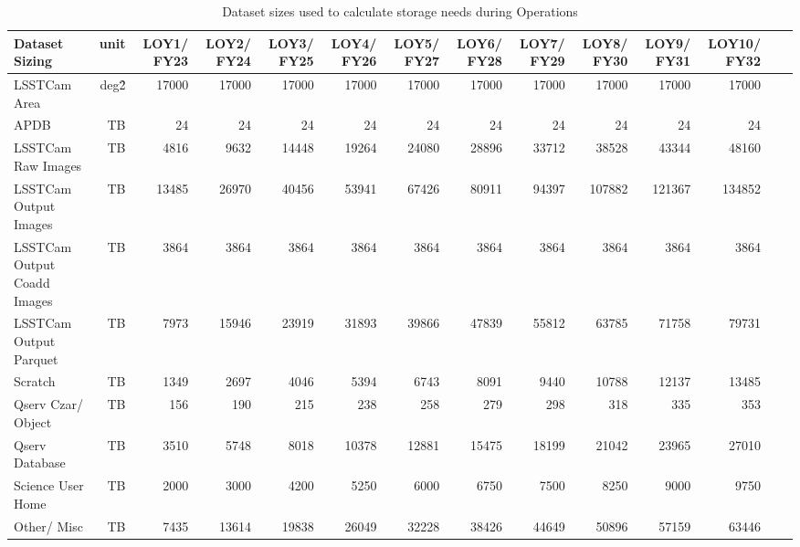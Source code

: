 \tiny \begin{longtable} { |p{}  |r  |r  |r  |r  |r  |r  |r  |r  |r  |r  |r  |r  |r |} 
\caption{Dataset sizes used to calculate storage needs during Operations \label{tab:datasetSizingOps}}\\ 
\hline 
\textbf{Dataset Sizing}&\textbf{unit}&\textbf{LOY1/ FY23}&\textbf{LOY2/ FY24}&\textbf{LOY3/ FY25}&\textbf{LOY4/ FY26}&\textbf{LOY5/ FY27}&\textbf{LOY6/ FY28}&\textbf{LOY7/ FY29}&\textbf{LOY8/ FY30}&\textbf{LOY9/ FY31}&\textbf{LOY10/ FY32}& \\ \hline
{LSSTCam Area}&{deg\^2}&{17000}&{17000}&{17000}&{17000}&{17000}&{17000}&{17000}&{17000}&{17000}&{17000}& \\ \hline
{APDB}&{TB}&{24}&{24}&{24}&{24}&{24}&{24}&{24}&{24}&{24}&{24}& \\ \hline
{LSSTCam Raw Images}&{TB}&{4816}&{9632}&{14448}&{19264}&{24080}&{28896}&{33712}&{38528}&{43344}&{48160}& \\ \hline
{LSSTCam Output Images}&{TB}&{13485}&{26970}&{40456}&{53941}&{67426}&{80911}&{94397}&{107882}&{121367}&{134852}& \\ \hline
{LSSTCam Output Coadd Images}&{TB}&{3864}&{3864}&{3864}&{3864}&{3864}&{3864}&{3864}&{3864}&{3864}&{3864}& \\ \hline
{LSSTCam Output Parquet}&{TB}&{7973}&{15946}&{23919}&{31893}&{39866}&{47839}&{55812}&{63785}&{71758}&{79731}& \\ \hline
{Scratch}&{TB}&{1349}&{2697}&{4046}&{5394}&{6743}&{8091}&{9440}&{10788}&{12137}&{13485}& \\ \hline
{Qserv Czar/ Object}&{TB}&{156}&{190}&{215}&{238}&{258}&{279}&{298}&{318}&{335}&{353}& \\ \hline
{Qserv Database}&{TB}&{3510}&{5748}&{8018}&{10378}&{12881}&{15475}&{18199}&{21042}&{23965}&{27010}& \\ \hline
{Science User Home}&{TB}&{2000}&{3000}&{4200}&{5250}&{6000}&{6750}&{7500}&{8250}&{9000}&{9750}& \\ \hline
{Other/ Misc}&{TB}&{7435}&{13614}&{19838}&{26049}&{32228}&{38426}&{44649}&{50896}&{57159}&{63446}& \\ \hline
\end{longtable} \normalsize
